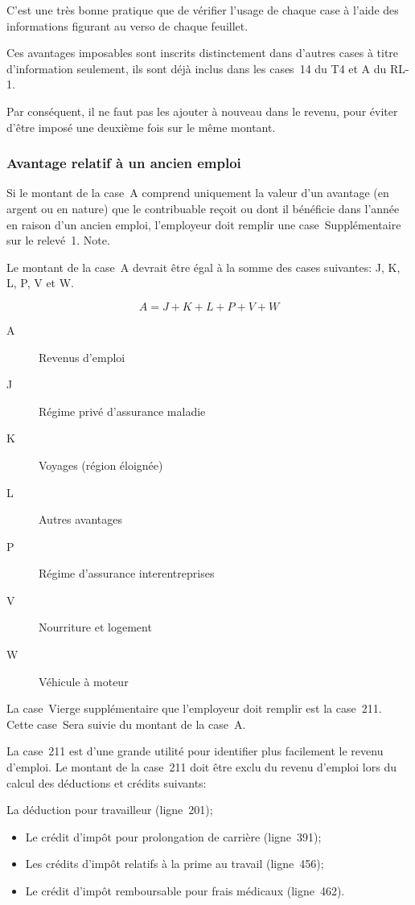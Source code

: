 \begin{note}
	C'est une très bonne pratique que de vérifier l'usage de chaque case à l'aide des informations figurant au verso de chaque feuillet.
	
	Ces avantages imposables sont inscrits distinctement dans d'autres cases à titre d'information seulement, ils sont déjà inclus dans les cases~14 du T4 et A du RL-1. 
	
	Par conséquent, il ne faut pas les ajouter à nouveau dans le revenu, pour éviter d'être imposé une deuxième fois sur le même montant. 
\end{note}

\subsubsection{Avantage relatif à un ancien emploi}
\qc
Si le montant de la case~A comprend uniquement la valeur d'un avantage (en argent ou en nature) que le contribuable reçoit ou dont il bénéficie dans l'année en raison d'un ancien emploi, l'employeur doit remplir une case~Supplémentaire sur le relevé~1. 
Note.

\begin{note}
	Le montant de la case~A devrait être égal à la somme des cases suivantes: J, K, L, P, V et W.
\end{note}
\[ A = J + K + L + P + V + W\]
\begin{description}
	\item[A] Revenus d'emploi
	\item[J] Régime privé d'assurance maladie 
	\item[K] Voyages (région éloignée) 
	\item[L] Autres avantages
	\item[P] Régime d'assurance interentreprises 
	\item[V] Nourriture et logement 
	\item[W] Véhicule à moteur 
\end{description}

La case~Vierge supplémentaire que l'employeur doit remplir est la case~211. Cette case~Sera suivie du montant de la case~A.

La case~211 est d'une grande utilité pour identifier plus facilement le revenu d'emploi.  Le montant de la case~211 doit être exclu du revenu d'emploi lors du calcul des déductions et crédits suivants:

La déduction pour travailleur (ligne~201);
\begin{itemize}
	\item Le crédit d'impôt pour prolongation de carrière (ligne~391);
	\item Les crédits d'impôt relatifs à la prime au travail (ligne~456);
	\item Le crédit d'impôt remboursable pour frais médicaux (ligne~462).
\end{itemize}

